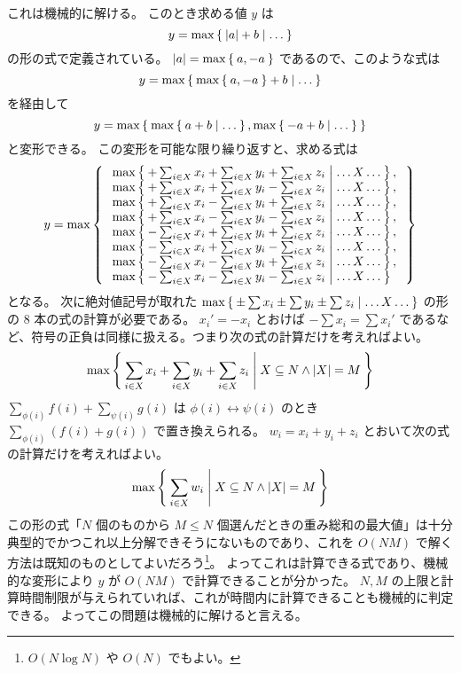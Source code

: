 \documentclass{ltjsarticle}
\begin{document}
これは機械的に解ける。
このとき求める値 $y$ は
\[
    y = \max \Set{ \lvert a \rvert + b | \dots }
\]
の形の式で定義されている。
$\lvert a \rvert = \max \Set{ a, -a }$ であるので、このような式は
\[
    y = \max \Set{ \max \Set{ a, -a } + b | \dots }
\]
を経由して
\[
    y = \max \Set{ \max \Set{ a + b | \dots }, \max \Set{ - a + b | \dots } }
\]
と変形できる。
この変形を可能な限り繰り返すと、求める式は
\[
    y = \max \Set{
        \begin{array}{l}
            \max \Set{ + \sum_{i \in X} x_i + \sum_{i \in X} y_i + \sum_{i \in X} z_i | \ldots X \ldots }, \\
            \max \Set{ + \sum_{i \in X} x_i + \sum_{i \in X} y_i - \sum_{i \in X} z_i | \ldots X \ldots }, \\
            \max \Set{ + \sum_{i \in X} x_i - \sum_{i \in X} y_i + \sum_{i \in X} z_i | \ldots X \ldots }, \\
            \max \Set{ + \sum_{i \in X} x_i - \sum_{i \in X} y_i - \sum_{i \in X} z_i | \ldots X \ldots }, \\
            \max \Set{ - \sum_{i \in X} x_i + \sum_{i \in X} y_i + \sum_{i \in X} z_i | \ldots X \ldots }, \\
            \max \Set{ - \sum_{i \in X} x_i + \sum_{i \in X} y_i - \sum_{i \in X} z_i | \ldots X \ldots }, \\
            \max \Set{ - \sum_{i \in X} x_i - \sum_{i \in X} y_i + \sum_{i \in X} z_i | \ldots X \ldots }, \\
            \max \Set{ - \sum_{i \in X} x_i - \sum_{i \in X} y_i - \sum_{i \in X} z_i | \ldots X \ldots }  \\
        \end{array}
    }
\]
となる。
次に絶対値記号が取れた $\max \Set{ \pm \sum x_i \pm \sum y_i \pm \sum z_i | \ldots X \ldots }$ の形の $8$ 本の式の計算が必要である。
$x_i' = - x_i$ とおけば $- \sum x_i = \sum x_i'$ であるなど、符号の正負は同様に扱える。つまり次の式の計算だけを考えればよい。
\[
    \max \Set{ \sum_{i \in X} x_i + \sum_{i \in X} y_i + \sum_{i \in X} z_i | X \subseteq N \land \lvert X \rvert = M }
\]
$\sum_{\phi(i)} f(i) + \sum_{\psi(i)} g(i)$ は $\phi(i) \leftrightarrow \psi(i)$ のとき $\sum_{\phi(i)} (f(i) + g(i))$ で置き換えられる。
$w_i = x_i + y_i + z_i$ とおいて次の式の計算だけを考えればよい。
\[
    \max \Set{ \sum_{i \in X} w_i | X \subseteq N \land \lvert X \rvert = M }
\]
この形の式「$N$ 個のものから $M \le N$ 個選んだときの重み総和の最大値」は十分典型的でかつこれ以上分解できそうにないものであり、これを $O(N M)$ で解く方法は既知のものとしてよいだろう\footnote{$O(N \log N)$ や $O(N)$ でもよい。}。
よってこれは計算できる式であり、機械的な変形により $y$ が $O(N M)$ で計算できることが分かった。
$N, M$ の上限と計算時間制限が与えられていれば、これが時間内に計算できることも機械的に判定できる。
よってこの問題は機械的に解けると言える。
\end{document}
